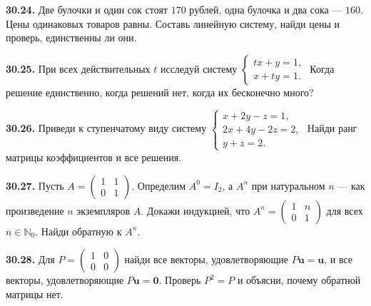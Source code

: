 \ifdim\dimexpr\ht\CatFlowBox+\dp\CatFlowBox\relax<58mm\dp\CatFlowBox=\dimexpr58mm-\ht\CatFlowBox\relax\fi%
\noindent\usebox{\CatFlowBox}\par\addvspace{2pt}

\noindent\begin{minipage}[t]{\linewidth}\textbf{30.24.} Две булочки и один сок стоят \(170\) рублей, одна булочка и два сока — \(160\). Цены одинаковых товаров равны. Составь линейную систему, найди цены и проверь, единственны ли они.\par\end{minipage}\par
\noindent\begin{minipage}[t]{\linewidth}\textbf{30.25.}\starmark{} При всех действительных \(t\) исследуй систему \(\begin{cases}tx+y=1,\\x+ty=1.\end{cases}\) Когда решение единственно, когда решений нет, когда их бесконечно много?\par\end{minipage}\par
\noindent\begin{minipage}[t]{\linewidth}\textbf{30.26.}\starmark{} Приведи к ступенчатому виду систему \(\begin{cases}x+2y-z=1,\\2x+4y-2z=2,\\y+z=2.\end{cases}\) Найди ранг матрицы коэффициентов и все решения.\par\end{minipage}\par
\noindent\begin{minipage}[t]{\linewidth}\textbf{30.27.}\starmark{} Пусть \(A=\begin{pmatrix}1&1\\0&1\end{pmatrix}\). Определим \(A^0=I_2\), а \(A^n\) при натуральном \(n\) — как произведение \(n\) экземпляров \(A\). Докажи индукцией, что \(A^n=\begin{pmatrix}1&n\\0&1\end{pmatrix}\) для всех \(n\in\mathbb N_0\). Найди обратную к \(A^n\).\par\end{minipage}\par
\noindent\begin{minipage}[t]{\linewidth}\textbf{30.28.}\starmark{} Для \(P=\begin{pmatrix}1&0\\0&0\end{pmatrix}\) найди все векторы, удовлетворяющие \(P\symbf u=\symbf u\), и все векторы, удовлетворяющие \(P\symbf u=\symbf0\). Проверь \(P^2=P\) и объясни, почему обратной матрицы нет.\par\end{minipage}\par
\endgroup
